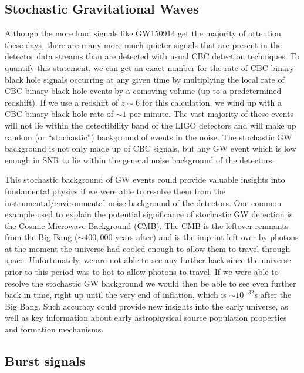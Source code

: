 \subsection{Stochastic Gravitational Waves}
%

Although the more loud signals like GW150914 get the majority of attention these days, there are many more much quieter signals that are present in the detector data streams than are detected with usual \ac{CBC} detection techniques. To quantify this statement, we can get an exact number for the rate of \ac{CBC} binary black hole signals occurring at any given time by multiplying the local rate of \ac{CBC} binary black hole events by a comoving volume (up to a predetermined redshift). If we use a redshift of $z \sim 6$ for this calculation, we wind up with a \ac{CBC} binary black hole rate of $\sim 1$ per minute. The vast majority of these events will not lie within the detectibility band of the \ac{LIGO} detectors and will make up random (or ``stochastic'') background of events in the noise. The stochastic \ac{GW} background is not only made up of \ac{CBC} signals, but any \ac{GW} event which is low enough in \ac{SNR} to lie within the general noise background of the detectors.

This stochastic background of \ac{GW} events could provide valuable insights into fundamental physics if we were able to resolve them from the instrumental/environmental noise background of the detectors. One common example used to explain the potential significance of stochastic \ac{GW} detection is the Cosmic Microwave Background (CMB). The CMB is the leftover remnants from the Big Bang ($\sim 400,000$ years after) and is the imprint left over by photons at the moment the universe had cooled enough to allow them to travel through space. Unfortunately, we are not able to see any further back since the universe prior to this period was to hot to allow photons to travel. If we were able to resolve the stochastic \ac{GW} background we would then be able to see even further back in time, right up until the very end of inflation, which is $\sim 10^{-32}$s after the Big Bang. Such accuracy could provide new insights into the early universe, as well as key information about early astrophysical source population properties and formation mechanisms. \cite{Romano2017}
 
\subsection{Burst signals}

